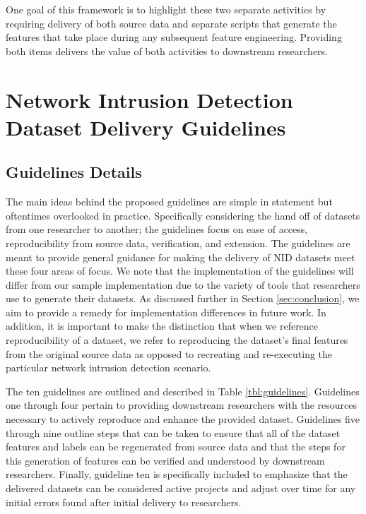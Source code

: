 \documentclass[conference]{IEEEtran}
\begin{document}
One goal of this framework is to highlight these two separate activities by requiring delivery of both source data and separate scripts that generate the features that take place during any subsequent feature engineering.
Providing both items delivers the value of both activities to downstream researchers.

\section{Network Intrusion Detection Dataset Delivery Guidelines}\label{sec:nidddf}

\subsection{Guidelines Details}\label{subsec:framework_overview}
The main ideas behind the proposed guidelines are simple in statement but oftentimes overlooked in practice.
Specifically considering the hand off of datasets from one researcher to another; the guidelines focus on ease of access, reproducibility from source data, verification, and extension.
The guidelines are meant to provide general guidance for making the delivery of NID datasets meet these four areas of focus.
We note that the implementation of the guidelines will differ from our sample implementation due to the variety of tools that researchers use to generate their datasets.
As discussed further in Section \ref{sec:conclusion}, we aim to provide a remedy for implementation differences in future work.
In addition, it is important to make the distinction that when we reference reproducibility of a dataset, we refer to reproducing the dataset's final features from the original source data as opposed to recreating and re-executing the particular network intrusion detection scenario.

The ten guidelines are outlined and described in Table \ref{tbl:guidelines}.
Guidelines one through four pertain to providing downstream researchers with the resources necessary to actively reproduce and enhance the provided dataset.
Guidelines five through nine outline steps that can be taken to ensure that all of the dataset features and labels can be regenerated from source data and that the steps for this generation of features can be verified and understood by downstream researchers.
Finally, guideline ten is specifically included to emphasize that the delivered datasets can be considered active projects and adjust over time for any initial errors found after initial delivery to researchers.
\end{document}
